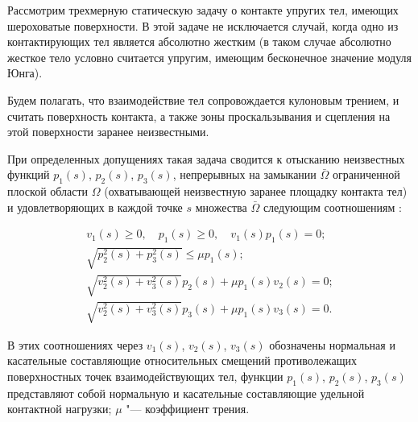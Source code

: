 \smallskip






Рассмотрим трехмерную статическую задачу о контакте упругих тел, имеющих шероховатые поверхности. В этой задаче не исключается случай, когда одно из контактирующих тел является абсолютно жестким (в таком случае абсолютно жесткое тело условно считается упругим, имеющим бесконечное значение модуля Юнга). 

Будем полагать, что взаимодействие тел сопровождается кулоновым трением, и считать поверхность контакта, а также зоны проскальзывания и сцепления на этой поверхности заранее неизвестными. 

При определенных допущениях такая задача сводится к отысканию неизвестных функций $p_{1}(s)$, $p_{2}(s)$, $p_{3}(s)$, непрерывных на замыкании $\bar{\Omega }$ ограниченной плоской области $\Omega $ (охватывающей неизвестную заранее площадку контакта тел) и удовлетворяющих в каждой точке $s$ множества $\bar{\Omega }$ следующим соотношениям \cite{al:bib12}:

\begin{equation} 

\label{GrindEQ__1_} 

\begin{array}{c} 

{v_{1}(s)\ge 0,\quad p_{1}(s)\ge 0,\quad v_{1}(s) p_{1}(s)=0;} 

\\[2mm] 

{\sqrt{p_{2}^{2}(s)+p_{3}^{2}(s)} \le \mu  p_{1}(s);} 

\\[2mm] 

{\sqrt{v_{2}^{2}(s)+v_{3}^{2}(s)}  p_{2}(s)+\mu  p_{1}(s) v_{2}(s)=0;} 

\\[2mm] 

{\sqrt{v_{2}^{2}(s)+v_{3}^{2}(s)}  p_{3}(s)+\mu  p_{1}(s) v_{3}(s)=0.} 

\end{array} 

\end{equation}

В этих соотношениях через $v_{1}(s)$, $v_{2}(s)$, $v_{3}(s)$ обозначены нормальная и касательные составляющие относительных смещений противолежащих поверхностных точек взаимодействующих тел, функции $p_{1}(s)$, $p_{2}(s)$, $p_{3}(s)$ представляют собой нормальную и касательные составляющие удельной контактной нагрузки; $\mu $ "--- коэффициент трения. 

